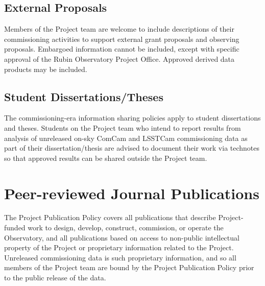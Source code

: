 \documentclass[SE,authoryear,toc,lsstdraft]{lsstdoc}
\begin{document}
\subsection{External Proposals}

Members of the Project team are welcome to include descriptions of their commissioning activities to support external grant proposals and observing proposals.
Embargoed information cannot be included, except with specific approval of the Rubin Observatory Project Office.
Approved derived data products may be included.

\subsection{Student Dissertations/Theses}

The commissioning-era information sharing policies apply to student dissertations and theses.
Students on the Project team who intend to report results from analysis of unreleased on-sky ComCam and LSSTCam commissioning data as part of their dissertation/thesis are advised to document their work via technotes so that approved results can be shared outside the Project team.

\section{Peer-reviewed Journal Publications}
\label{publications}

The Project Publication Policy  covers all publications that describe Project-funded work to design, develop, construct, commission, or operate the Observatory, and all publications based on access to non-public intellectual property of the Project or proprietary information related to the Project.
Unreleased commissioning data is such proprietary information, and so all members of the Project team are bound by the Project Publication Policy prior to the public release of the data.
\end{document}
